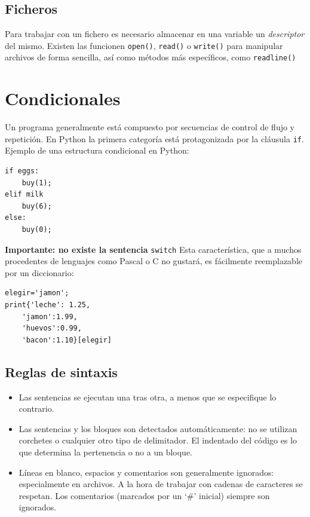 \documentclass[12pt]{article} %
\begin{document}
\subsection{Ficheros}
Para trabajar con un fichero es necesario almacenar en una variable un \textit{descriptor} del mismo. Existen las funcionen \verb+open()+, \verb+read()+ o \verb+write()+ para manipular archivos de forma sencilla, así como métodos más específicos, como \verb+readline()+


\section{Condicionales}
Un programa generalmente está compuesto por secuencias de control de flujo y repetición. En Python la primera categoría está protagonizada por la cláusula \verb+if+.
Ejemplo de una estructura condicional en Python:
\begin{lstlisting}[frame=single, showspaces=false]
if eggs:
	buy(1);
elif milk
	buy(6);
else:
	buy(0);
\end{lstlisting}
{\Large \textbf{Importante: no existe la sentencia} \verb+switch+}
Esta característica, que a muchos procedentes de lenguajes como Pascal o C no gustará, es fácilmente reemplazable por un diccionario:
\begin{lstlisting}[frame=single, showspaces=false]
elegir='jamon';
print{'leche': 1.25,
	'jamon':1.99,
	'huevos':0.99,
	'bacon':1.10}[elegir]
\end{lstlisting}
\subsection{Reglas de sintaxis}
\begin{itemize}
	\item Las sentencias se ejecutan una tras otra, a menos que se especifique lo contrario.
	\item Las sentencias y los bloques son detectados automáticamente: no se utilizan corchetes o cualquier otro tipo de delimitador. El indentado del código es lo que determina la pertenencia o no a un bloque.
	\item Líneas en blanco, espacios y comentarios son generalmente ignorados: especialmente en archivos. A la hora de trabajar con cadenas de caracteres se respetan. Los comentarios (marcados por un `\#' inicial) siempre son ignorados.
\end{itemize}
\end{document}
